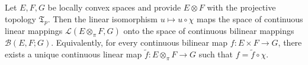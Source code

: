 Let $E, F, G$ be locally convex spaces and provide $E \otimes F$ with the projective topology $\mathfrak{T}_p$. Then the linear isomorphism $u \mapsto u \circ \chi$ maps the space of continuous linear mappings $\mathcal{L}(E \otimes_\pi F, G)$ onto the space of continuous bilinear mappings $\mathcal{B}(E, F; G)$. Equivalently, for every continuous bilinear map $f: E \times F \to G$, there exists a unique continuous linear map $\tilde{f}: E \otimes_\pi F \to G$ such that $f = \tilde{f} \circ \chi$.
